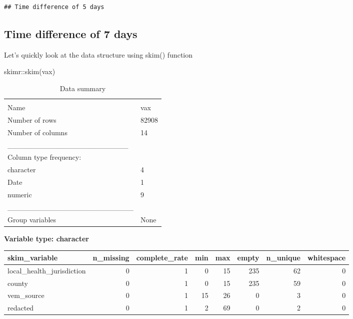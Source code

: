 \documentclass[
]{article}
\newenvironment{Shaded}{\begin{snugshade}}{\end{snugshade}}
\newcommand{\FunctionTok}[1]{\textcolor[rgb]{0.00,0.00,0.00}{#1}}
\newcommand{\NormalTok}[1]{#1}
\newcommand{\SpecialCharTok}[1]{\textcolor[rgb]{0.00,0.00,0.00}{#1}}
\begin{document}
\begin{verbatim}
## Time difference of 5 days
\end{verbatim}

\hypertarget{time-difference-of-7-days}{%
\subsection{Time difference of 7 days}\label{time-difference-of-7-days}}

Let's quickly look at the data structure using skim() function

\begin{Shaded}
\begin{Highlighting}[]
\NormalTok{skimr}\SpecialCharTok{::}\FunctionTok{skim}\NormalTok{(vax)}
\end{Highlighting}
\end{Shaded}

\begin{longtable}[]{@{}ll@{}}
\caption{Data summary}\tabularnewline
\toprule
& \\
\midrule
\endfirsthead
\toprule
& \\
\midrule
\endhead
Name & vax \\
Number of rows & 82908 \\
Number of columns & 14 \\
\_\_\_\_\_\_\_\_\_\_\_\_\_\_\_\_\_\_\_\_\_\_\_ & \\
Column type frequency: & \\
character & 4 \\
Date & 1 \\
numeric & 9 \\
\_\_\_\_\_\_\_\_\_\_\_\_\_\_\_\_\_\_\_\_\_\_\_\_ & \\
Group variables & None \\
\bottomrule
\end{longtable}

\textbf{Variable type: character}

\begin{longtable}[]{@{}lrrrrrrr@{}}
\toprule
skim\_variable & n\_missing & complete\_rate & min & max & empty &
n\_unique & whitespace \\
\midrule
\endhead
local\_health\_jurisdiction & 0 & 1 & 0 & 15 & 235 & 62 & 0 \\
county & 0 & 1 & 0 & 15 & 235 & 59 & 0 \\
vem\_source & 0 & 1 & 15 & 26 & 0 & 3 & 0 \\
redacted & 0 & 1 & 2 & 69 & 0 & 2 & 0 \\
\bottomrule
\end{longtable}
\end{document}
